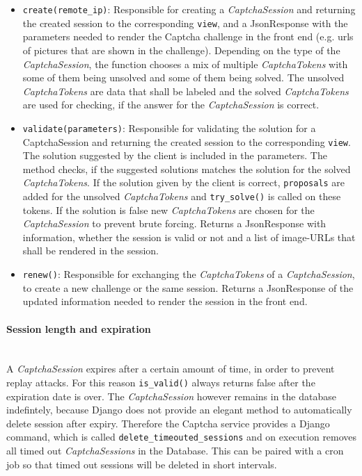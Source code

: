 \begin{itemize}
\item \verb|create(remote_ip)|: Responsible for creating a \emph{CaptchaSession} and returning the created session to the corresponding \verb|view|, and a JsonResponse with the parameters needed to render the Captcha challenge in the front end (e.g. urls of pictures that are shown in the challenge). Depending on the type of the \emph{CaptchaSession}, the function chooses a mix of multiple \emph{CaptchaTokens} with some of them being unsolved and some of them being solved. The unsolved \emph{CaptchaTokens} are data that shall be labeled and the solved \emph{CaptchaTokens} are used for checking, if the answer for the \emph{CaptchaSession} is correct. 
\item \verb|validate(parameters)|: Responsible for validating the solution for a CaptchaSession and returning the created session to the corresponding \verb|view|. The solution suggested by the client is included in the parameters. The method checks, if the suggested solutions matches the solution for the solved \emph{CaptchaTokens}. If the solution given by the client is correct, \verb|proposals| are added for the unsolved \emph{CaptchaTokens} and \verb|try_solve()| is called on these tokens. If the solution is false new \emph{CaptchaTokens} are chosen for the \emph{CaptchaSession} to prevent brute forcing. Returns a JsonResponse with information, whether the session is valid or not and a list of image-URLs that shall be rendered in the session.
\item \verb|renew()|: Responsible for exchanging the \emph{CaptchaTokens} of a \emph{CaptchaSession}, to create a new challenge or the same session. Returns a JsonResponse of the updated information needed to render the session in the front end.
\end{itemize}

\clearpage
\paragraph{Session length and expiration} \mbox{} \\

A \emph{CaptchaSession} expires after a certain amount of time, in order to prevent replay attacks. For this reason \verb|is_valid()| always returns false after the expiration date is over. The \emph{CaptchaSession} however remains in the database indefintely, because Django does not provide an elegant method to automatically delete session after expiry. Therefore the Captcha service provides a Django command, which is called \verb|delete_timeouted_sessions| and on execution removes all timed out \emph{CaptchaSessions} in the Database. This can be paired with a cron job so that timed out sessions will be deleted in short intervals. 

